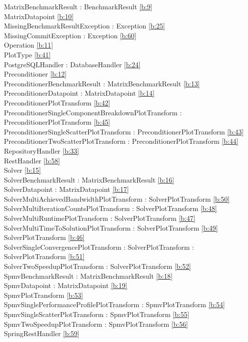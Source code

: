 MatrixBenchmarkResult : BenchmarkResult  \ref{b:9}\\
MatrixDatapoint  \ref{b:10}\\
MissingBenchmarkResultException : Exception  \ref{b:25}\\
MissingCommitException : Exception  \ref{b:60}\\
Operation  \ref{b:11}\\
PlotType  \ref{b:41}\\
PostgreSQLHandler : DatabaseHandler  \ref{b:24}\\
Preconditioner  \ref{b:12}\\
PreconditionerBenchmarkResult : MatrixBenchmarkResult  \ref{b:13}\\
PreconditionerDatapoint : MatrixDatapoint  \ref{b:14}\\
PreconditionerPlotTransform  \ref{b:42}\\
PreconditionerSingleComponentBreakdownPlotTransform : PreconditionerPlotTransform  \ref{b:45}\\
PreconditionerSingleScatterPlotTransform : PreconditionerPlotTransform  \ref{b:43}\\
PreconditionerTwoScatterPlotTransform : PreconditionerPlotTransform  \ref{b:44}\\
RepositoryHandler  \ref{b:33}\\
RestHandler  \ref{b:58}\\
Solver  \ref{b:15}\\
SolverBenchmarkResult : MatrixBenchmarkResult  \ref{b:16}\\
SolverDatapoint : MatrixDatapoint  \ref{b:17}\\
SolverMultiAchievedBandwidthPlotTransform : SolverPlotTransform  \ref{b:50}\\
SolverMultiIterationCountsPlotTransform : SolverPlotTransform  \ref{b:48}\\
SolverMultiRuntimePlotTransform : SolverPlotTransform  \ref{b:47}\\
SolverMultiTimeToSolutionPlotTransform : SolverPlotTransform  \ref{b:49}\\
SolverPlotTransform  \ref{b:46}\\
SolverSingleConvergencePlotTransform : SolverPlotTransform : SolverPlotTransform  \ref{b:51}\\
SolverTwoSpeedupPlotTransform : SolverPlotTransform  \ref{b:52}\\
SpmvBenchmarkResult : MatrixBenchmarkResult  \ref{b:18}\\
SpmvDatapoint : MatrixDatapoint  \ref{b:19}\\
SpmvPlotTransform  \ref{b:53}\\
SpmvSinglePerformanceProfilePlotTransform : SpmvPlotTransform  \ref{b:54}\\
SpmvSingleScatterPlotTransform : SpmvPlotTransform  \ref{b:55}\\
SpmvTwoSpeedupPlotTransform : SpmvPlotTransform  \ref{b:56}\\
SpringRestHandler \ref{b:59}\\
